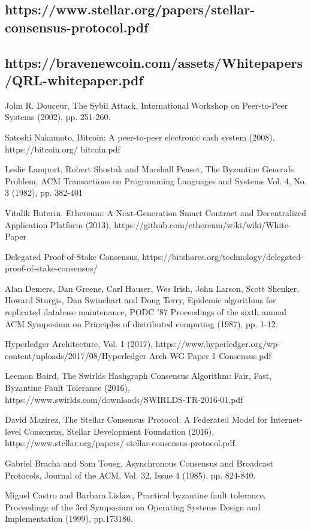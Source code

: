 \documentclass[11pt]{article}
\begin{document}
\subsection{https://www.stellar.org/papers/stellar-consensus-protocol.pdf}

\subsection{https://bravenewcoin.com/assets/Whitepapers/QRL-whitepaper.pdf}

John R. Douceur, The Sybil Attack, International Workshop on Peer-to-Peer Systems (2002), pp. 251-260.


Satoshi Nakamoto, Bitcoin: A peer-to-peer electronic cash system (2008), https://bitcoin.org/ bitcoin.pdf


Leslie Lamport, Robert Shostak and Marshall Peaset, The Byzantine Generals Problem, ACM Transactions on Programming Languages and Systems Vol. 4, No. 3 (1982), pp. 382-401


Vitalik Buterin. Ethereum: A Next-Generation Smart Contract and Decentralized Application Platform (2013), https://github.com/ethereum/wiki/wiki/White-Paper


Delegated Proof-of-Stake Consensus, https://bitshares.org/technology/delegated-proof-of-stake-consensus/


Alan Demers, Dan Greene, Carl Hauser, Wes Irish, John Larson, Scott Shenker, Howard Sturgis, Dan Swinehart and Doug Terry, Epidemic algorithms for replicated database maintenance, PODC '87 Proceedings of the sixth annual ACM Symposium on Principles of distributed computing (1987), pp. 1-12.


Hyperledger Architecture, Vol. 1 (2017), https://www.hyperledger.org/wp-content/uploads/2017/08/Hyperledger Arch WG Paper 1 Consensus.pdf


Leemon Baird, The Swirlds Hashgraph Consensus Algorithm: Fair, Fast, Byzantine Fault Tolerance (2016), https://www.swirlds.com/downloads/SWIRLDS-TR-2016-01.pdf


David Mazirez, The Stellar Consensus Protocol: A Federated Model for Internet- level Consensus, Stellar Development Foundation (2016), https://www.stellar.org/papers/ stellar-consensus-protocol.pdf.


Gabriel Bracha and Sam Toueg, Asynchronous Consensus and Broadcast Protocols, Journal of the ACM, Vol. 32, Issue 4 (1985), pp. 824-840.


Miguel Castro and Barbara Liskov, Practical byzantine fault tolerance, Proceedings of the 3rd Symposium on Operating Systems Design and Implementation (1999), pp.173186.
\end{document}
